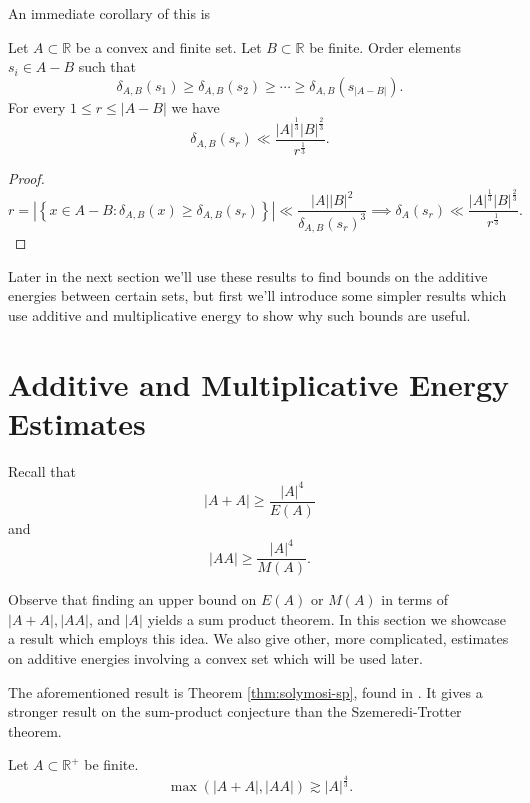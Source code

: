 \documentclass[12pt,reqno]{amsart}
\begin{document}
An immediate corollary of this is

\begin{corollary}\label{cor:szt-delta}
Let \(A \subset \mathbb{R} \) be a convex and finite set. Let \(B \subset \mathbb{R} \) be finite.
Order elements \(s_{i} \in A-B\) such that 
\[
    \delta_{A,B} (s_1) \geq \delta_{A,B} (s_2) \geq \cdots \geq \delta_{A,B} (s _{\left\lvert A - B \right\rvert } )
.\]
For every \(1 \leq r \leq \left\lvert A - B \right\rvert\) we have
\[
    \delta_{A,B} (s _{r} ) \ll \frac{\left\lvert A \right\rvert^{\frac{1}{3} } \left\lvert B \right\rvert ^{\frac{2}{3} } }{r^{\frac{1}{3} }}
.\]
\end{corollary}

\begin{proof}
\[
    r = \left\lvert \left\{ x \in A-B : \delta _{A,B} (x) \geq \delta_{A,B} (s _{r} ) \right\}  \right\rvert \ll \frac{\left\lvert A \right\rvert \left\lvert B \right\rvert ^{2} }{\delta_{A,B} (s _{r} )^{3} } \implies \delta_{A} (s _{r} ) \ll \frac{\left\lvert A \right\rvert ^{\frac{1}{3} } \left\lvert B \right\rvert ^{\frac{2}{3} }}{r^{\frac{1}{3} }}
.\]
\end{proof}

Later in the next section we'll use these results to find bounds on the additive
energies between certain sets, but first we'll introduce some simpler results which
use additive and multiplicative energy to show why such bounds are useful.

\section{Additive and Multiplicative Energy Estimates}

Recall that
\[
    \left\lvert A + A \right\rvert \geq  \frac{\left\lvert A \right\rvert ^{4}}{ E(A) }
\]
and
\[
    \left\lvert AA \right\rvert \geq \frac{\left\lvert A \right\rvert ^{4}}{M(A) }
.\]

Observe that finding an upper bound on \(E(A)\) or \(M(A)\) in terms of \(\left\lvert A + A \right\rvert, \left\lvert AA \right\rvert    \), and \(\left\lvert A \right\rvert \)
yields a sum product theorem. In this section we showcase a result which employs this idea.
We also give other, more complicated, estimates on additive energies involving a convex set which
will be used later.

The aforementioned result is Theorem \ref{thm:solymosi-sp}, found in \cite{Solymosi}. It gives a stronger result
on the sum-product conjecture than the Szemeredi-Trotter theorem. 
\begin{theorem*}
Let \(A \subset \mathbb{R}^{+} \) be finite.
\[
    \max \left( \left\lvert A+A \right\rvert , \left\lvert AA \right\rvert  \right) \gtrsim  \left\lvert A \right\rvert ^{\frac{4}{3}}
.\]
\end{theorem*}
\end{document}
